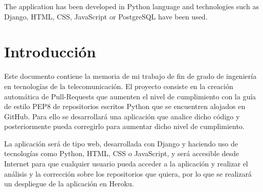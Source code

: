 \documentclass[a4paper, 12pt]{book}
\begin{document}
The application has been developed in Python language and technologies such as Django, HTML, CSS, JavaScript or PostgreSQL have been used.



\tableofcontents 
\cleardoublepage
{} %
\listoffigures %
\cleardoublepage
{} %
\listoftables %



\cleardoublepage
\chapter{Introducción}
\label{chap:intro}
\label{sec:intro} %
Este documento contiene la memoria de mi trabajo de fin de grado de ingeniería en tecnologías de la telecomunicación.
El proyecto consiste en la creación automática de Pull-Requests que aumenten el nivel de cumplimiento con la guía de estilo PEP8 de repositorios escritos Python que se encuentren alojados en GitHub.
Para ello se desarrollará una aplicación que analice dicho código y posteriormente pueda corregirlo para aumentar dicho nivel de cumplimiento.

La aplicación será de tipo web, desarrollada con Django y haciendo uso de tecnologías como Python, HTML, CSS o JavaScript, y será accesible desde Internet para que cualquier usuario pueda acceder a la aplicación y realizar el análisis y la corrección sobre los repositorios que quiera, por lo que se realizará un despliegue de la aplicación en Heroku.
\end{document}
